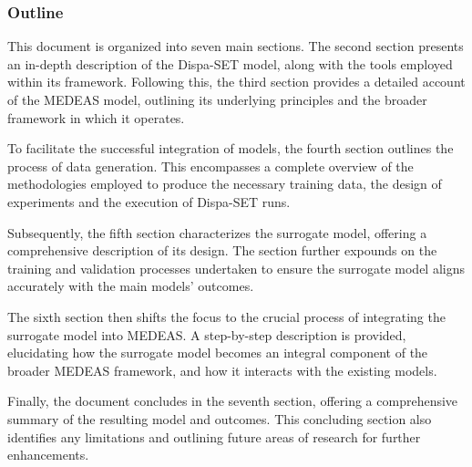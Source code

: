 \subsubsection{Outline}

This document is organized into seven main sections. The second section presents an in-depth description of the Dispa-SET model, along with the tools employed within its framework. Following this, the third section provides a detailed account of the MEDEAS model, outlining its underlying principles and the broader framework in which it operates.

To facilitate the successful integration of models, the fourth section outlines the process of data generation. This encompasses a complete overview of the methodologies employed to produce the necessary training data, the design of experiments and the execution of Dispa-SET runs.

Subsequently, the fifth section characterizes the surrogate model, offering a comprehensive description of its design. The section further expounds on the training and validation processes undertaken to ensure the surrogate model aligns accurately with the main models' outcomes.

The sixth section then shifts the focus to the crucial process of integrating the surrogate model into MEDEAS. A step-by-step description is provided, elucidating how the surrogate model becomes an integral component of the broader MEDEAS framework, and how it interacts with the existing models.

Finally, the document concludes in the seventh section, offering a comprehensive summary of the resulting model and outcomes. This concluding section also identifies any limitations and outlining future areas of research for further enhancements. 


